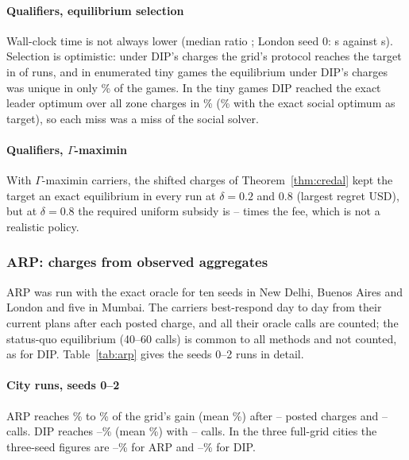 \documentclass[preprint,11pt]{elsarticle}
\theoremstyle{definition}
\theoremstyle{remark}
\begin{document}
\paragraph{Qualifiers, equilibrium selection} Wall-clock time is not always lower (median ratio \DipTimeMed; London seed 0: \DipLondonTime{} s against \DipLondonGridTime{} s). Selection is optimistic: under DIP's charges the grid's protocol reaches the target in \DipSelSame{} of \DipRuns{} runs, and in \DipTinyN{} enumerated tiny games the equilibrium under DIP's charges was unique in only \DipTinyUniquePct\% of the games. In the tiny games DIP reached the exact leader optimum over all zone charges in \DipTinyHitPct\% (\DipTinyHitXPct\% with the exact social optimum as target), so each miss was a miss of the social solver.

\paragraph{Qualifiers, $\Gamma$-maximin} With $\Gamma$-maximin carriers, the shifted charges of Theorem~\ref{thm:credal} kept the target an exact equilibrium in every run at $\delta=0.2$ and $0.8$ (largest regret \DipCredalRegret{} USD), but at $\delta=0.8$ the required uniform subsidy is \DipCredalSubMin--\DipCredalSubMax{} times the fee, which is not a realistic policy.

\subsubsection{ARP: charges from observed aggregates}\label{sec:res-arp}

ARP was run with the exact oracle for ten seeds in New Delhi, Buenos Aires and London and five in Mumbai. The carriers best-respond day to day from their current plans after each posted charge, and all their oracle calls are counted; the status-quo equilibrium (40--60 calls) is common to all methods and not counted, as for DIP. Table~\ref{tab:arp} gives the seeds 0--2 runs in detail.


\paragraph{City runs, seeds 0--2} ARP reaches \ArpGainMin\% to \ArpGainMax\% of the grid's gain (mean \ArpGainMean\%) after \ArpRoundsMin--\ArpRoundsMax{} posted charges and \ArpCallsMin--\ArpCallsMax{} calls. DIP reaches \ArpDipGainMin--\ArpDipGainMax\% (mean \ArpDipGainMean\%) with \ArpDipCallsMin--\ArpDipCallsMax{} calls. In the three full-grid cities the three-seed figures are \ArpFullArpMin--\ArpFullArpMax\% for ARP and \ArpFullDipMin--\ArpFullDipMax\% for DIP.
\end{document}
